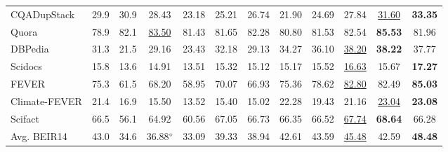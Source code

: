 \begin{table*}[ht]
{\begin{tabular}{l|c|cc|cccccc|cc}
    CQADupStack        & 29.9          & 30.9         & 28.43\rlap{$\text{}^{\diamond \mathsection}$}         & 23.18  & 25.21          & 26.74         & 21.90         & 24.69\rlap{$\text{}^{\diamond}$}        & 27.84\rlap{$\text{}^{\diamond \mathsection}$}          & \uline{31.60}
    & \textbf{33.35}\rlap{$\text{}^{\mathparagraph}$} \\
    Quora              & 78.9          & 82.1         & \uline{83.50}\rlap{$\text{}^{\diamond \mathsection}$} & 81.43  & 81.65          & 82.28         & 80.80         & 81.53        & 82.54\rlap{$\text{}^{\diamond \mathsection}$}          & \textbf{85.53}  & 81.96          \\
    DBPedia            & 31.3          & 21.5         & 29.16\rlap{$\text{}^{\diamond}$}         & 23.43  & 32.18          & 29.13         & 34.27         & 36.10\rlap{$\text{}^{\dagger \diamond}$}        & \uline{38.20}\rlap{$\text{}^{\dagger \diamond \mathsection}$}  & \textbf{38.22}  & 37.77 \\
    Scidocs            & 15.8          & 13.6         & 14.91\rlap{$\text{}^{\diamond}$}         & 13.51  & 15.32          & 15.12         & 15.17         & 15.52\rlap{$\text{}^{\dagger \diamond}$}        & \uline{16.63}\rlap{$\text{}^{\dagger \diamond \mathsection}$}  & 15.67  & \textbf{17.27}\rlap{$\text{}^{\mathparagraph}$} \\
    FEVER              & 75.3          & 61.5         & 68.20\rlap{$\text{}^{\diamond}$}         & 58.95  & 70.07          & 66.93         & 75.36         & 78.62\rlap{$\text{}^{\dagger \diamond}$}        & \uline{82.80}\rlap{$\text{}^{\dagger \diamond \mathsection}$}  & 82.49  & \textbf{85.03}\rlap{$\text{}^{\mathparagraph}$} \\
    Climate-FEVER      & 21.4          & 16.9         & 15.50\rlap{$\text{}^{\diamond}$}         & 13.52  & 15.40          & 15.02         & 22.28         & 19.43\rlap{$\text{}^{\dagger \diamond}$}        & 21.16\rlap{$\text{}^{\dagger \diamond \mathsection}$}          & \uline{23.04}   & \textbf{23.08} \\
    Scifact            & 66.5          & 56.1         & 64.92\rlap{$\text{}^{\diamond}$}         & 60.56  & 67.05          & 66.73         & 66.35         & 66.52\rlap{$\text{}^{\diamond}$}        & \uline{67.74}\rlap{$\text{}^{\dagger \diamond}$}  & \textbf{68.64}  & 66.28          \\
    \hline
    Avg. BEIR14        & 43.0          & 34.6         & 36.88{$\text{}^{\diamond}$}         & 33.09  & 39.33          & 38.94         & 42.61         & 43.59\rlap{$\text{}^{\dagger \diamond}$}        & \uline{45.48}\rlap{$\text{}^{\dagger \diamond \mathsection}$}  & 42.59  & \textbf{48.48}\rlap{$\text{}^{\mathparagraph}$} \\

\end{tabular}}
\end{table*}

